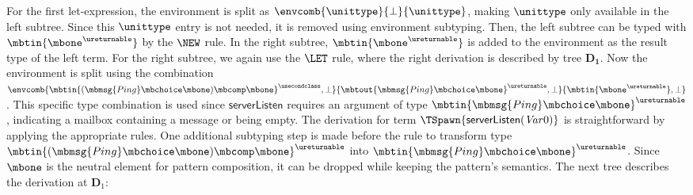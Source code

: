 For the first let-expression, the environment is split as $\envcomb{\unittype}{\bot}{\unittype}$, making $\unittype$ only available in the left subtree.
Since this $\unittype$ entry is not needed, it is removed using environment subtyping.
Then, the left subtree can be typed with $\mbtin{\mbone ^ \ureturnable}$ by the $\NEW$ rule.
In the right subtree, $\mbtin{\mbone ^ \ureturnable}$ is added to the environment as the result type of the left term.
For the right subtree, we again use the $\LET$ rule, where the right derivation is described by tree $\mathbf{D_1}$.
Now the environment is split using the combination
$\envcomb{\mbtin{(\mbmsg{Ping} \mbchoice \mbone) \mbcomp \mbone} ^ \usecondclass, \bot}{\mbtout{\mbmsg{Ping} \mbchoice \mbone} ^ \ureturnable, \bot}{\mbtin{\mbone ^ \ureturnable}, \bot}$.
This specific type combination is used since $\mathsf{serverListen}$ requires an argument of type $\mbtin{\mbmsg{Ping} \mbchoice \mbone} ^ \ureturnable$,
indicating a mailbox containing a  message or being empty.
The derivation for term $\TSpawn{\mathsf{serverListen}(\Var{0})}$ is straightforward by applying the appropriate rules.
One additional subtyping step is made before the \VAR rule to transform type $\mbtin{(\mbmsg{Ping} \mbchoice \mbone) \mbcomp \mbone} ^ \ureturnable$
into $\mbtin{\mbmsg{Ping} \mbchoice \mbone} ^ \ureturnable$.
Since $\mbone$ is the neutral element for pattern composition, it can be dropped while keeping the pattern's semantics.
The next tree describes the derivation at $\mathbf{D}_1$:

